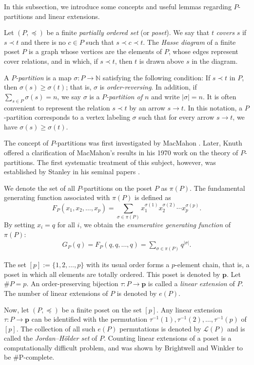 \documentclass[reqno, 12pt]{article}
\theoremstyle{mydefinition}
\theoremstyle{myremark}
\numberwithin{algorithm}{section}
\begin{document}
In this subsection, we introduce some concepts and useful lemmas  regarding $P$-partitions and linear extensions.

Let $(P,\preceq)$ be a finite \emph{partially ordered set} (or \emph{poset}).
We say that $t$ \emph{covers} $s$ if $s\prec t$ and there is no $c\in P$ such that $s\prec c\prec t$.
The \emph{Hasse diagram} of a finite poset $P$ is a graph whose vertices are the elements of $P$, whose edges represent cover relations, and in which, if $s\prec t$, then $t$ is drawn above $s$ in the diagram.


A \emph{$P$-partition} is a map $\sigma: P\rightarrow \mathbb{N}$ satisfying the following condition:
If $s\prec t$ in $P$, then $\sigma(s)\geq \sigma(t)$; that is, $\sigma$ is \emph{order-reversing}.
In addition, if $\sum_{s \in P} \sigma(s) = n$, we say $\sigma$ is a \emph{$P$-partition of $n$} and write $|\sigma| = n$.
It is often convenient to represent the relation $s \prec t$ by an arrow $s \to t$.
In this notation, a $P$-partition corresponds to a vertex labeling $\sigma$ such that for every arrow $s \to t$, we have $\sigma(s) \geq \sigma(t)$.


The concept of $P$-partitions was first investigated by MacMahon \cite[Subsections 439,441]{MacMahon19}.
Later, Knuth \cite{Knuth70} offered a clarification of MacMahon's results in his 1970 work on the theory of $P$-partitions.
The first systematic treatment of this subject, however, was established by Stanley in his seminal papers \cite{Stanley-Order-parti71,Stanley-Order-parti72}.


We denote the set of all $P$-partitions on the poset $P$ as $\pi(P)$.
The fundamental generating function associated with $\pi(P)$ is defined as
$$F_P(x_1,x_2,\ldots,x_p)=\sum_{\sigma\in \pi(P)}x_1^{\sigma(1)}x_2^{\sigma(2)}\cdots x_p^{\sigma(p)}.$$
By setting $x_i=q$ for all $i$, we obtain the \emph{enumerative generating function} of $\pi(P)$:
\begin{align*}
G_P(q)=F_P(q,q,\ldots,q)=\sum_{\sigma\in \pi(P)} q^{|\sigma|}.
\end{align*}


The set $[p]:=\{1,2,\ldots,p\}$ with its usual order forms a $p$-element chain, that is, a poset in which all elements are totally ordered. This poset is denoted by $\mathbf{p}$.
Let $\#P=p$. An order-preserving bijection $\tau: P\rightarrow \mathbf{p}$ is called a \emph{linear extension} of $P$.
The number of linear extensions of $P$ is denoted by $e(P)$.


Now, let $(P,\preceq)$ be a finite poset on the set $[p]$.
Any linear extension $\tau \colon P \to \mathbf{p}$ can be identified with the permutation $\tau^{-1}(1), \tau^{-1}(2), \dots, \tau^{-1}(p)$ of $[p]$.
The collection of all such $e(P)$ permutations is denoted by $\mathcal{L}(P)$ and is called the \emph{Jordan--H\"older set} of $P$.
Counting linear extensions of a poset is a computationally difficult problem, and was shown by Brightwell and Winkler \cite{Brightwell91} to be \#P-complete.
\end{document}

